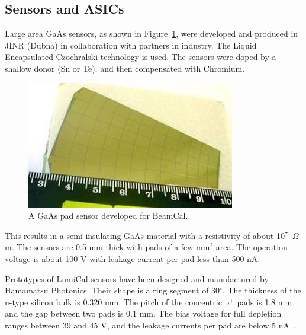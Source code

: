 \subsection{Sensors and ASICs}


Large area GaAs sensors, as shown in Figure~\ref{fig:GaAs}, were developed
and produced in JINR (Dubna) in collaboration with partners in industry. The Liquid Encapsulated
Czochralski technology is used. The sensors were
doped by a shallow donor (Sn or Te),
and then compensated  with Chromium.
\begin{figure}[htbp]
\begin{center}
    \includegraphics[width=0.8\columnwidth]{Calorimeter/FCAL/figs/GaAs_sensor_new.jpg}
  \end{center}
          \caption{A GaAs pad sensor developed for BeamCal.}
    \label{fig:GaAs}
\end{figure}
This results in a semi-insulating GaAs material with a resistivity of about 10$^7$~$\Omega$m.
The sensors are 0.5 mm thick with pads of a few mm$^2$ area. The operation voltage is about 100 V with
leakage current per pad less than 500 nA.

Prototypes of LumiCal sensors have been designed
and manufactured by Hamamatsu
Photonics.
Their shape is a ring segment of 30$^\circ$.
The thickness of the n-type silicon bulk is 0.320 mm.
The pitch of the concentric p$^+$ pads is 1.8 mm and
the gap between two pads is 0.1 mm.
The bias voltage for full depletion ranges between 39 and 45 V,
and the leakage currents per pad are below 5 nA~\cite{eudet2009}.

